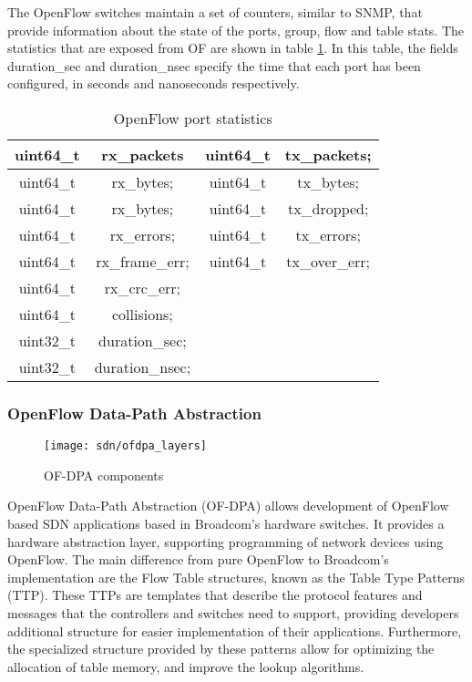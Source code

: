 \begin {enumerate}
The OpenFlow switches maintain a set of counters, similar to SNMP, that provide information about the state of the ports, group, flow and table stats. The
statistics that are exposed from OF are shown in table \ref{tab:of_port_stats}. In this table, the fields duration\_sec and duration\_nsec specify the time that 
each port has been configured, in seconds and nanoseconds respectively.

\begin{table}[H]
    \centering
    \caption{OpenFlow port statistics}
    \begin{tabular}{c | c || c | c}
       uint64\_t & rx\_packets     & uint64\_t & tx\_packets;     \\ \hline
       uint64\_t & rx\_bytes;      & uint64\_t & tx\_bytes;       \\ \hline
       uint64\_t & rx\_bytes;      & uint64\_t & tx\_dropped;     \\ \hline
       uint64\_t & rx\_errors;     & uint64\_t & tx\_errors;      \\ \hline
       uint64\_t & rx\_frame\_err; & uint64\_t & tx\_over\_err;   \\ \hline
       uint64\_t & rx\_crc\_err;   &                              \\ \hline
       uint64\_t & collisions;     &                              \\ \hline
       uint32\_t & duration\_sec;  &                              \\ \hline
       uint32\_t & duration\_nsec; &                 
    \label{tab:of_port_stats}
    \end{tabular}
\end{table}

\subsubsection{OpenFlow Data-Path Abstraction} \label{sec:ofdpa}

\begin{figure}[H]
    \centering
    \texttt{[image: sdn/ofdpa\_layers]}
    \caption{OF-DPA components \cite{broadcom_corporation_openflow_2017}}
    \label{fig:ofdpa_struct}
\end{figure}

OpenFlow Data-Path Abstraction (OF-DPA) allows development of OpenFlow based SDN applications based in Broadcom's hardware switches. It provides a hardware 
abstraction layer, supporting programming of network devices using OpenFlow. The main difference from pure OpenFlow to Broadcom's implementation are the Flow
Table structures, known as the Table Type Patterns (TTP). These TTPs are templates that describe the protocol features and messages that the controllers and switches
need to support, providing developers additional structure for easier implementation of their applications. Furthermore, the specialized structure provided by these
patterns allow for optimizing the allocation of table memory, and improve the lookup algorithms.


\end{enumerate}
